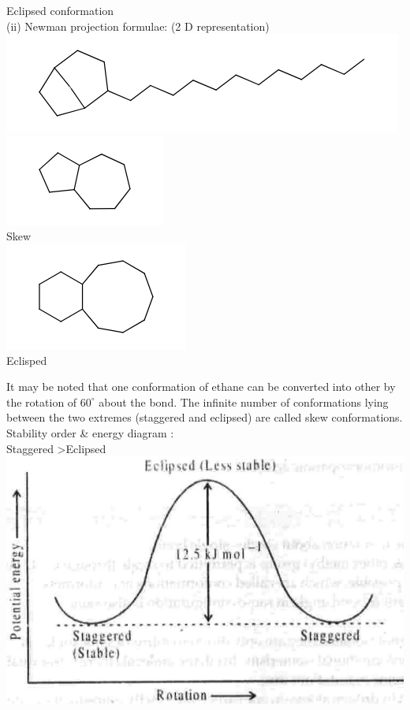 \documentclass[10pt]{article}
\begin{document}
Eclipsed conformation\\
(ii) Newman projection formulae: (2 D representation)\\
\includegraphics{smile-6c7a203cdd6a9402d31fe9324d731d900eb8f1f1}\\
\includegraphics{smile-be059c35d63591a29b9c276ad535e7982f7ac14c}\\
Skew\\
\includegraphics{smile-30f871a84f125454e13cab5edd9b266d354c339e}\\
Eclisped

It may be noted that one conformation of ethane can be converted into other by the rotation of $60^{\circ}$ about the bond. The infinite number of conformations lying between the two extremes (staggered and eclipsed) are called skew conformations.\\
Stability order \& energy diagram :\\
Staggered >Eclipsed\\
\includegraphics[max width=\textwidth, center]{2025_01_28_8470952b98110cec3aabg-060(3)}
\end{document}
